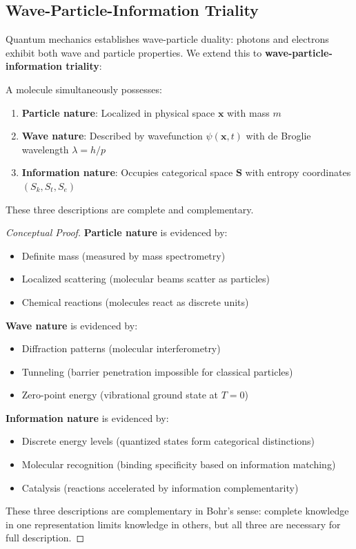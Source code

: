 
\subsection{Wave-Particle-Information Triality}

Quantum mechanics establishes wave-particle duality: photons and electrons exhibit both wave and particle properties. We extend this to \textbf{wave-particle-information triality}:

\begin{theorem}
A molecule simultaneously possesses:
\begin{enumerate}
\item \textbf{Particle nature}: Localized in physical space $\mathbf{x}$ with mass $m$
\item \textbf{Wave nature}: Described by wavefunction $\psi(\mathbf{x}, t)$ with de Broglie wavelength $\lambda = h/p$
\item \textbf{Information nature}: Occupies categorical space $\mathbf{S}$ with entropy coordinates $(S_k, S_t, S_e)$
\end{enumerate}

These three descriptions are complete and complementary.
\end{theorem}

\begin{proof}[Conceptual Proof]
\textbf{Particle nature} is evidenced by:
\begin{itemize}
\item Definite mass (measured by mass spectrometry)
\item Localized scattering (molecular beams scatter as particles)
\item Chemical reactions (molecules react as discrete units)
\end{itemize}

\textbf{Wave nature} is evidenced by:
\begin{itemize}
\item Diffraction patterns (molecular interferometry)
\item Tunneling (barrier penetration impossible for classical particles)
\item Zero-point energy (vibrational ground state at $T = 0$)
\end{itemize}

\textbf{Information nature} is evidenced by:
\begin{itemize}
\item Discrete energy levels (quantized states form categorical distinctions)
\item Molecular recognition (binding specificity based on information matching)
\item Catalysis (reactions accelerated by information complementarity)
\end{itemize}

These three descriptions are complementary in Bohr's sense: complete knowledge in one representation limits knowledge in others, but all three are necessary for full description.
\end{proof}

